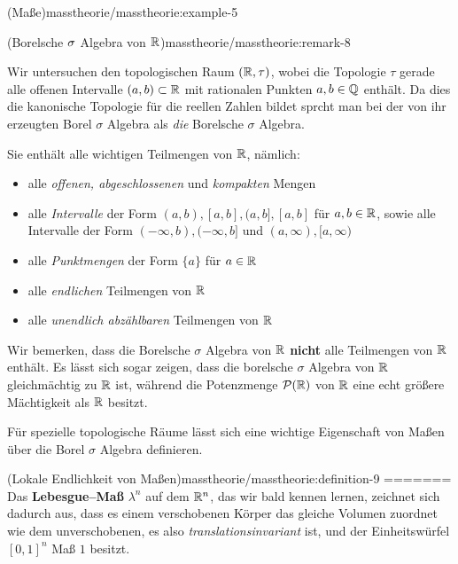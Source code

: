 \begin{example}{(Maße)}{masstheorie/masstheorie:example-5}
\begin{remark}{(Borelsche \protect\(\sigma\protect\) Algebra von \protect\(\mathbb{R}\protect\))}{masstheorie/masstheorie:remark-8}
\par
Wir untersuchen den topologischen Raum \((\mathbb{R}, \tau)\), wobei die Topologie \(\tau\) gerade alle offenen Intervalle \((a,b) \subset \mathbb{R}\) mit rationalen Punkten \(a,b \in \mathbb{Q}\) enthält.
Da dies die kanonische Topologie für die reellen Zahlen bildet sprcht man bei der von ihr erzeugten Borel \(\sigma\) Algebra als \emph{die} Borelsche \(\sigma\) Algebra.

\par
Sie enthält alle wichtigen Teilmengen von \(\mathbb{R}\), nämlich:
\begin{itemize}
\item {} 
\par
alle \emph{offenen, abgeschlossenen} und \emph{kompakten} Mengen

\item {} 
\par
alle \emph{Intervalle} der Form \((a,b), [a,b], (a,b], [a,b]\) für \(a,b \in \mathbb{R}\), sowie alle Intervalle der Form \((-\infty, b), (-\infty, b]\) und \((a, \infty), [a,\infty)\)

\item {} 
\par
alle \emph{Punktmengen} der Form \(\{a\}\) für \(a \in \mathbb{R}\)

\item {} 
\par
alle \emph{endlichen} Teilmengen von \(\mathbb{R}\)

\item {} 
\par
alle \emph{unendlich abzählbaren} Teilmengen von \(\mathbb{R}\)

\end{itemize}

\par
Wir bemerken, dass die Borelsche \(\sigma\) Algebra von \(\mathbb{R}\) \textbf{nicht} alle Teilmengen von \(\mathbb{R}\) enthält.
Es lässt sich sogar zeigen, dass die borelsche \(\sigma\) Algebra von \(\mathbb{R}\) gleichmächtig zu \(\mathbb{R}\) ist, während die Potenzmenge \(\mathcal{P}(\mathbb{R})\) von \(\mathbb{R}\) eine echt größere Mächtigkeit als \(\mathbb{R}\) besitzt.
\end{remark}

\par
Für spezielle topologische Räume lässt sich eine wichtige Eigenschaft von Maßen über die Borel \(\sigma\) Algebra definieren.
\begin{definition}{(Lokale Endlichkeit von Maßen)}{masstheorie/masstheorie:definition-9}
=======
Das \textbf{Lebesgue–Maß} \(\lambda^n\) auf dem \(\mathbb{R}^n\), das wir bald kennen lernen, zeichnet sich dadurch aus, dass es einem verschobenen Körper das gleiche Volumen zuordnet wie dem unverschobenen, es also \emph{translationsinvariant} ist, und der Einheitswürfel \([0,1]^n\) Maß \(1\) besitzt.


\end{definition}
\end{example}
